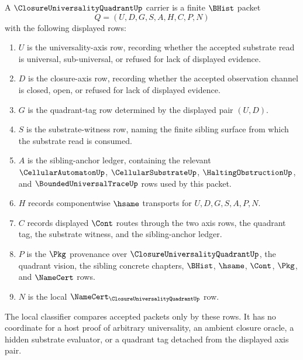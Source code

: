 \begin{definition}
\label{def:closure-universality-carrier}
A $\ClosureUniversalityQuadrantUp$ carrier is a finite $\BHist$ packet
$$
Q=(U,D,G,S,A,H,C,P,N)
$$
with the following displayed rows:
\begin{enumerate}
\item $U$ is the universality-axis row, recording whether the accepted substrate read is universal, sub-universal, or refused for lack of displayed evidence.
\item $D$ is the closure-axis row, recording whether the accepted observation channel is closed, open, or refused for lack of displayed evidence.
\item $G$ is the quadrant-tag row determined by the displayed pair $(U,D)$.
\item $S$ is the substrate-witness row, naming the finite sibling surface from which the substrate read is consumed.
\item $A$ is the sibling-anchor ledger, containing the relevant $\CellularAutomatonUp$, $\CellularSubstrateUp$, $\HaltingObstructionUp$, and $\BoundedUniversalTraceUp$ rows used by this packet.
\item $H$ records componentwise $\hsame$ transports for $U,D,G,S,A,P,N$.
\item $C$ records displayed $\Cont$ routes through the two axis rows, the quadrant tag, the substrate witness, and the sibling-anchor ledger.
\item $P$ is the $\Pkg$ provenance over $\ClosureUniversalityQuadrantUp$, the quadrant vision, the sibling concrete chapters, $\BHist$, $\hsame$, $\Cont$, $\Pkg$, and $\NameCert$ rows.
\item $N$ is the local $\NameCert_{\ClosureUniversalityQuadrantUp}$ row.
\end{enumerate}
The local classifier compares accepted packets only by these rows. It has no coordinate for a host proof of arbitrary universality, an ambient closure oracle, a hidden substrate evaluator, or a quadrant tag detached from the displayed axis pair.
\end{definition}

